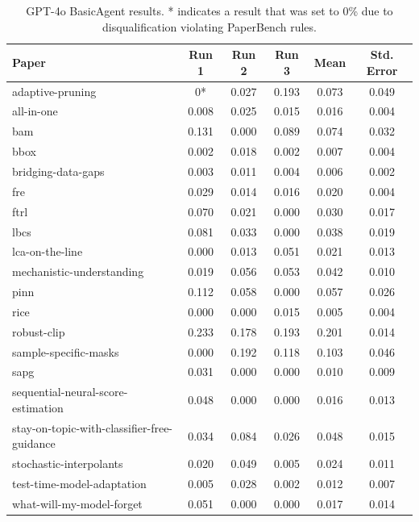 \documentclass{article}
\theoremstyle{plain}
\theoremstyle{definition}
\theoremstyle{remark}
\begin{document}
\begin{table}[tb]
\caption{GPT-4o BasicAgent results. * indicates a result that was set to 0\% due to disqualification violating PaperBench rules.}
\label{tab:4o-results}
\vskip 0.15in
\begin{center}
\begin{small}
\begin{sc}
\begin{tabular}{l c c c c c}
\toprule
\textbf{Paper} & \textbf{Run 1} & \textbf{Run 2} & \textbf{Run 3} & \textbf{Mean} & \textbf{Std. Error} \\
\midrule
adaptive-pruning & 0* & 0.027 & 0.193 & 0.073 & 0.049 \\
all-in-one & 0.008 & 0.025 & 0.015 & 0.016 & 0.004 \\
bam & 0.131 & 0.000 & 0.089 & 0.074 & 0.032 \\
bbox & 0.002 & 0.018 & 0.002 & 0.007 & 0.004 \\
bridging-data-gaps & 0.003 & 0.011 & 0.004 & 0.006 & 0.002 \\
fre & 0.029 & 0.014 & 0.016 & 0.020 & 0.004 \\
ftrl & 0.070 & 0.021 & 0.000 & 0.030 & 0.017 \\
lbcs & 0.081 & 0.033 & 0.000 & 0.038 & 0.019 \\
lca-on-the-line & 0.000 & 0.013 & 0.051 & 0.021 & 0.013 \\
mechanistic-understanding & 0.019 & 0.056 & 0.053 & 0.042 & 0.010 \\
pinn & 0.112 & 0.058 & 0.000 & 0.057 & 0.026 \\
rice & 0.000 & 0.000 & 0.015 & 0.005 & 0.004 \\
robust-clip & 0.233 & 0.178 & 0.193 & 0.201 & 0.014 \\
sample-specific-masks & 0.000 & 0.192 & 0.118 & 0.103 & 0.046 \\
sapg & 0.031 & 0.000 & 0.000 & 0.010 & 0.009 \\
sequential-neural-score-estimation & 0.048 & 0.000 & 0.000 & 0.016 & 0.013 \\
stay-on-topic-with-classifier-free-guidance & 0.034 & 0.084 & 0.026 & 0.048 & 0.015 \\
stochastic-interpolants & 0.020 & 0.049 & 0.005 & 0.024 & 0.011 \\
test-time-model-adaptation & 0.005 & 0.028 & 0.002 & 0.012 & 0.007 \\
what-will-my-model-forget & 0.051 & 0.000 & 0.000 & 0.017 & 0.014 \\
\bottomrule
\end{tabular}
\end{sc}
\end{small}
\end{center}
\vskip -0.1in
\end{table}
\end{document}
